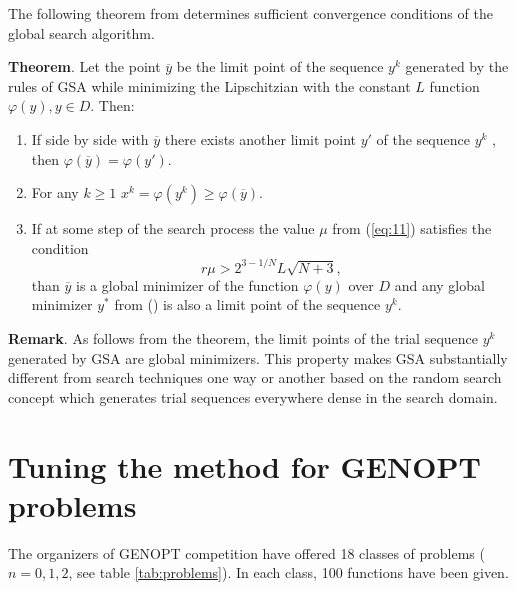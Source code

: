 \documentclass{llncs}
\begin{document}
The following theorem from \cite{Strongin2000} determines sufficient convergence conditions of the global search algorithm.

\textbf{Theorem}. Let the point $\overline{y}$ be the limit point of the sequence ${y^k}$ generated by the rules of GSA while minimizing the Lipschitzian with the constant $L$ function $\varphi(y), y \in D$. Then:
\begin{enumerate}
	\item If side by side with $\overline{y}$ there exists another limit point $y'$ of the sequence ${y^k}$ , then $\varphi(\overline{y})=\varphi(y')$.
	\item For any $k \geq 1$ $x^k=\varphi (y^k) \geq \varphi (\overline{y})$.
	\item If at some step of the search process the value $\mu$ from (\ref{eq:11}) satisfies the condition 
\[
  r\mu > 2^{3-1/N}L\sqrt{N+3},
\]
than $\overline{y}$ is a global minimizer of the function $\varphi (y)$ over $D$ and any global minimizer $y^\ast$ from () is also a limit point of the sequence ${y^k}$.
		
\end{enumerate}

\textbf{Remark}. As follows from the theorem, the limit points of the trial sequence ${y^k}$ generated by GSA are global minimizers. This property makes GSA substantially different from search techniques one way or another based on the random search concept which generates trial sequences everywhere dense in the search domain.


\section{Tuning the method for GENOPT problems}\label{sec:3}

The organizers of GENOPT competition have offered 18 classes of problems ($n=0,1,2$, see table \ref{tab:problems}). In each class, 100 functions have been given.
\end{document}
